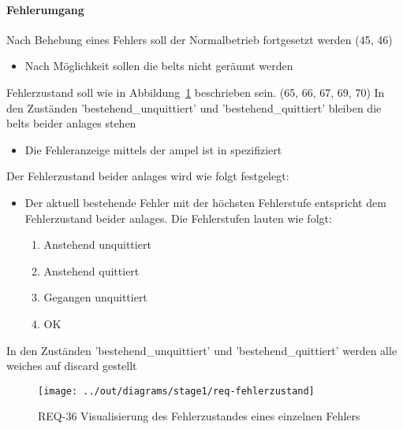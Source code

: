 \paragraph{Fehlerumgang}
\begin{itemize}
     Nach Behebung eines Fehlers soll der Normalbetrieb fortgesetzt werden (45, 46)
    \begin{itemize}
        \item Nach Möglichkeit sollen die \glspl{belt} nicht geräumt werden
    \end{itemize}
     Fehlerzustand soll wie in Abbildung~\ref{fig:stm-fehlerzustand} beschrieben sein. (65, 66, 67, 69, 70)
     In den Zuständen 'bestehend\_unquittiert' und 'bestehend\_quittiert' bleiben die
    \glspl{belt} beider \glspl{anlage} stehen
    \begin{itemize}
        \item Die Fehleranzeige mittels der \gls{ampel} ist in  spezifiziert
    \end{itemize}
     Der Fehlerzustand beider \glspl{anlage} wird wie folgt festgelegt:
    \begin{itemize}
        \item Der aktuell bestehende Fehler mit der höchsten Fehlerstufe entspricht dem Fehlerzustand beider \glspl{anlage}.
        Die Fehlerstufen lauten wie folgt:
        \begin{enumerate}
            \item Anstehend unquittiert
            \item Anstehend quittiert
            \item Gegangen unquittiert
            \item OK
        \end{enumerate}
    \end{itemize}
     In den Zuständen 'bestehend\_unquittiert' und 'bestehend\_quittiert'
    werden alle \glspl{weiche} auf \gls{discard} gestellt
\end{itemize}

\begin{figure}[h]
    \centering
    \texttt{[image: ../out/diagrams/stage1/req-fehlerzustand]}
    \caption{REQ-36 Visualisierung des Fehlerzustandes eines einzelnen Fehlers}
    \label{fig:stm-fehlerzustand}
\end{figure}
